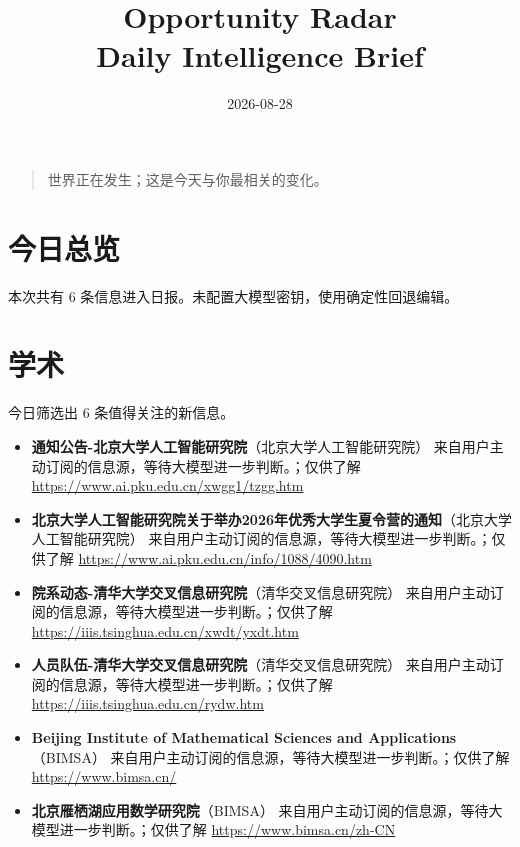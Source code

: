 \documentclass[11pt]{ctexart}
\title{Opportunity Radar\\Daily Intelligence Brief}
\date{2026-08-28}
\begin{document}
\maketitle
\begin{quote}\Large 世界正在发生；这是今天与你最相关的变化。\end{quote}
\section*{今日总览}
本次共有 6 条信息进入日报。未配置大模型密钥，使用确定性回退编辑。
\section*{学术}
今日筛选出 6 条值得关注的新信息。
\begin{itemize}
\item \textbf{通知公告-北京大学人工智能研究院}（北京大学人工智能研究院） 来自用户主动订阅的信息源，等待大模型进一步判断。；仅供了解 \url{https://www.ai.pku.edu.cn/xwgg1/tzgg.htm}
\item \textbf{北京大学人工智能研究院关于举办2026年优秀大学生夏令营的通知}（北京大学人工智能研究院） 来自用户主动订阅的信息源，等待大模型进一步判断。；仅供了解 \url{https://www.ai.pku.edu.cn/info/1088/4090.htm}
\item \textbf{院系动态-清华大学交叉信息研究院}（清华交叉信息研究院） 来自用户主动订阅的信息源，等待大模型进一步判断。；仅供了解 \url{https://iiis.tsinghua.edu.cn/xwdt/yxdt.htm}
\item \textbf{人员队伍-清华大学交叉信息研究院}（清华交叉信息研究院） 来自用户主动订阅的信息源，等待大模型进一步判断。；仅供了解 \url{https://iiis.tsinghua.edu.cn/rydw.htm}
\item \textbf{Beijing Institute of Mathematical Sciences and Applications}（BIMSA） 来自用户主动订阅的信息源，等待大模型进一步判断。；仅供了解 \url{https://www.bimsa.cn/}
\item \textbf{北京雁栖湖应用数学研究院}（BIMSA） 来自用户主动订阅的信息源，等待大模型进一步判断。；仅供了解 \url{https://www.bimsa.cn/zh-CN}
\end{itemize}
\end{document}
